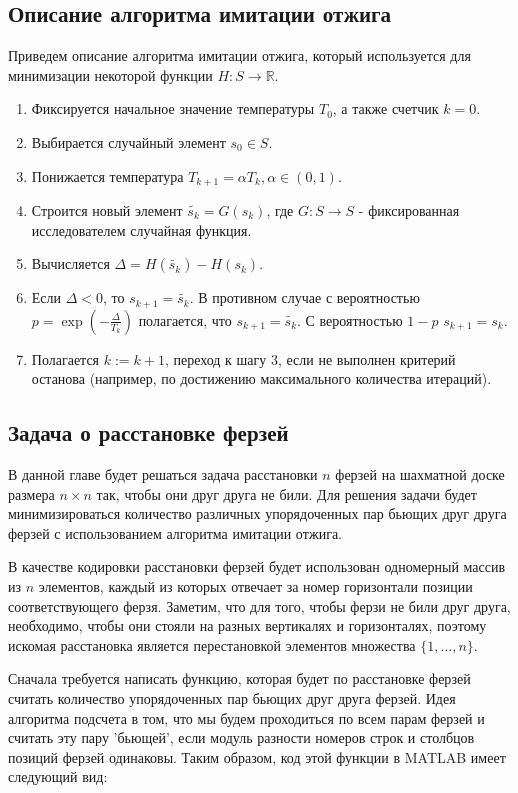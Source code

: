\documentclass[../main.tex]{subfiles}
\begin{document}
	\subsection{Описание алгоритма имитации отжига}
	Приведем описание алгоритма имитации отжига, который используется для минимизации некоторой функции $H: S \rightarrow \mathbb{R}$.
	\begin{enumerate}
		\item Фиксируется начальное значение температуры $T_0$, а также счетчик $k = 0$. 
		\item Выбирается случайный элемент $s_0 \in S$.
		\item  Понижается температура $T_{k+1} = \alpha T_k, \alpha \in (0, 1)$.
		\item Строится новый элемент $\tilde{s_k} = G(s_k)$, где $G: S \rightarrow S$ - фиксированная исследователем случайная функция.
		\item Вычисляется $\Delta = H(\tilde{s_k}) - H(s_k)$. 
		\item Если $\Delta < 0$, то $s_{k+1} = \tilde{s_k}$. В противном случае с вероятностью $p = \exp{(-\frac{\Delta}{T_k})}$ полагается, что $s_{k+1} = \tilde{s_k}$. С вероятностью $1 - p$  $s_{k+1} = s_k$.
		\item Полагается $k := k + 1$, переход к шагу 3, если не выполнен критерий останова (например, по достижению максимального количества итераций).
		
	\end{enumerate}
	
	
	\subsection{Задача о расстановке ферзей}
	В данной главе будет решаться задача расстановки $n$ ферзей на шахматной доске размера $n\times n$ так, чтобы они друг друга не били. Для решения задачи будет минимизироваться количество различных упорядоченных пар бьющих друг друга ферзей с использованием алгоритма имитации отжига. 
	
	В качестве кодировки расстановки ферзей будет использован одномерный массив из $n$ элементов, каждый из которых отвечает за номер горизонтали позиции соответствующего ферзя. Заметим, что для того, чтобы ферзи не били друг друга, необходимо, чтобы они стояли на разных вертикалях и горизонталях, поэтому искомая расстановка является перестановкой элементов множества $\{1, \dots, n\}$.
	
	Сначала требуется написать функцию, которая будет по расстановке ферзей считать количество упорядоченных пар бьющих друг друга ферзей. Идея алгоритма подсчета в том, что мы будем проходиться по всем парам ферзей и считать эту пару 'бьющей', если модуль разности номеров строк и столбцов позиций ферзей одинаковы. Таким образом, код этой функции в MATLAB имеет следующий вид:
	
\end{document}
